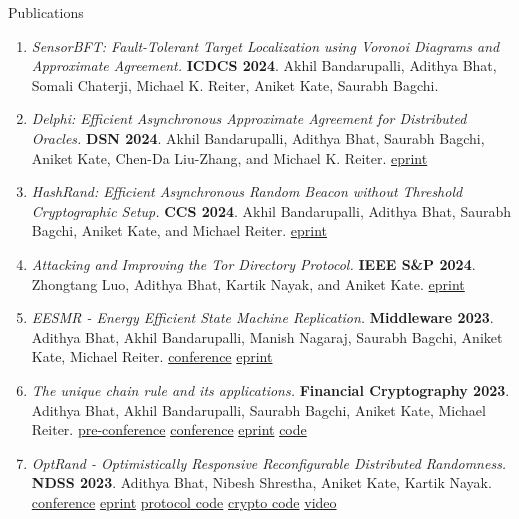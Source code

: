 \documentclass{resume}
\begin{document}
\begin{rSection}{Publications}
\label{sec:org5a58166}
\vspace{0.5em}
\begin{enumerate}
\item \label{org327a667} \emph{SensorBFT: Fault-Tolerant Target Localization using Voronoi Diagrams and Approximate Agreement.} \textbf{ICDCS 2024}. Akhil Bandarupalli, Adithya Bhat, Somali Chaterji, Michael K. Reiter, Aniket Kate, Saurabh Bagchi.
\item \label{org2de1d29} \emph{Delphi: Efficient Asynchronous Approximate Agreement for Distributed Oracles.} \textbf{DSN 2024}. Akhil Bandarupalli, Adithya Bhat, Saurabh Bagchi, Aniket Kate, Chen-Da Liu-Zhang, and Michael K. Reiter. \href{https://arxiv.org/pdf/2405.02431}{eprint}
\item \label{orge8c0cb3} \emph{HashRand: Efficient Asynchronous Random Beacon without Threshold Cryptographic Setup.} \textbf{CCS 2024}. Akhil Bandarupalli, Adithya Bhat, Saurabh Bagchi, Aniket Kate, and Michael Reiter. \href{https://eprint.iacr.org/2023/1755.pdf}{eprint}
\item \label{org5499178} \emph{Attacking and Improving the Tor Directory Protocol.} \textbf{IEEE S\&P 2024}. Zhongtang Luo, Adithya Bhat, Kartik Nayak, and Aniket Kate. \href{https://zhtluo.com/paper/Attacking\_and\_Improving\_the\_Tor\_Directory\_Protocol.pdf}{eprint}
\item \label{org83cdfb7} \emph{EESMR - Energy Efficient State Machine Replication.} \textbf{Middleware 2023}. Adithya Bhat, Akhil Bandarupalli, Manish Nagaraj, Saurabh Bagchi, Aniket Kate, Michael Reiter. \href{https://dl.acm.org/doi/10.1145/3590140.3592848}{conference} \href{https://arxiv.org/abs/2304.04998}{eprint}
\item \label{orgf480c59}\label{org98a3691} \emph{The unique chain rule and its applications.} \textbf{Financial Cryptography 2023}. Adithya Bhat, Akhil Bandarupalli, Saurabh Bagchi, Aniket Kate, Michael Reiter. \href{https://fc23.ifca.ai/preproceedings/138.pdf}{pre-conference} \href{https://doi.org/10.1007/978-3-031-47754-6\_3}{conference} \href{https://eprint.iacr.org/2021/180}{eprint} \href{https://github.com/adithyabhatkajake/libchatter-rs}{code}
\item \label{org77ecad9} \emph{OptRand - Optimistically Responsive Reconfigurable Distributed Randomness.} \textbf{NDSS 2023}. Adithya Bhat, Nibesh Shrestha, Aniket Kate, Kartik Nayak. \href{https://www.ndss-symposium.org/ndss-paper/optrand-optimistically-responsive-reconfigurable-distributed-randomness/}{conference} \href{https://eprint.iacr.org/2022/193}{eprint} \href{https://github.com/nibeshrestha/optrand}{protocol code} \href{https://github.com/libdist-rs/optrand-rs}{crypto code} \href{https://www.youtube.com/watch?v=6DH2bGXP3-4}{video}

\end{enumerate}
\end{rSection}
\end{document}
